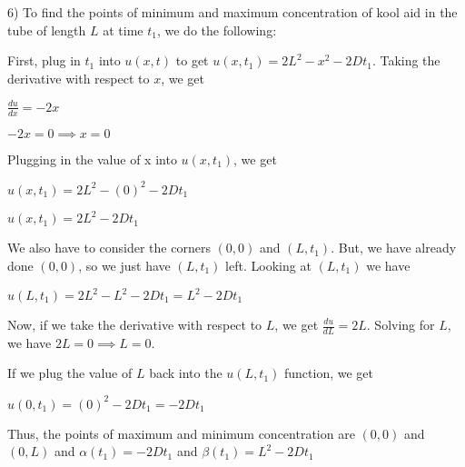 \documentclass[executivepaper]{article}
\begin{document}
\begin{flushleft}

6) To find the points of minimum and maximum concentration of kool aid in the tube of length $L$ at time $t_{1}$, we do the following:

\begin{center}

First, plug in $t_{1}$ into $u(x,t)$ to get $u(x,t_{1})=2L^2-x^2-2Dt_{1}$. Taking the derivative with respect to $x$, we get

\vspace{3mm}

$\frac{du}{dx}=-2x$

\vspace{3mm}

$-2x=0 \implies x=0$

\vspace{3mm}

Plugging in the value of x into $u(x,t_{1})$, we get

\pagebreak

\vspace*{-40mm}

$u(x,t_{1})=2L^2-(0)^2-2Dt_{1}$

\vspace{3mm}

$u(x,t_{1})=2L^2-2Dt_{1}$

\vspace{3mm}

We also have to consider the corners $(0,0)$ and $(L,t_{1})$. But, we have already done $(0,0)$, so we just have $(L,t_{1})$ left. Looking at $(L,t_{1})$ we have 

\vspace{3mm}

$u(L,t_{1})=2L^2-L^2-2Dt_{1}=L^2-2Dt_{1}$

\vspace{3mm}

Now, if we take the derivative with respect to $L$, we get $\frac{du}{dL}=2L$. Solving for $L$, we have $2L=0 \implies L=0$.

\vspace{3mm}

If we plug the value of $L$ back into the $u(L, t_{1})$ function, we get

\vspace{3mm}

$u(0, t_{1})=(0)^2-2Dt_{1}=-2Dt_{1}$

\vspace{3mm}

Thus, the points of maximum and minimum concentration are $(0,0)$ and $(0,L)$ and $\alpha(t_{1})=-2Dt_{1}$ and $\beta(t_{1})=L^2-2Dt_{1}$

\end{center}

\end{flushleft}
\end{document}
